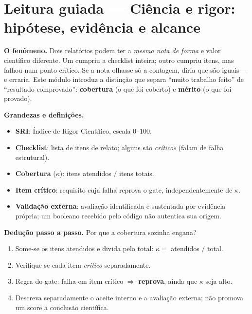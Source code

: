 

\section[Leitura guiada]{Leitura guiada — Ciência e rigor: hipótese, evidência e alcance}


\begin{descricao}
\textbf{O fenômeno.} Dois relatórios podem ter a \emph{mesma nota de forma} e valor
científico diferente. Um cumpriu a checklist inteira; outro cumpriu itens, mas falhou
num ponto crítico. Se a nota olhasse só a contagem, diria que são iguais --- e
erraria. Este módulo introduz a distinção que separa ``muito trabalho feito'' de
``resultado comprovado'': \textbf{cobertura} (o que foi coberto) e \textbf{mérito}
(o que foi provado).
\end{descricao}

\begin{definicao}
\textbf{Grandezas e definições.}
\begin{itemize}[leftmargin=1.3em,itemsep=1pt]
  \item \textbf{SRI}: Índice de Rigor Científico, escala $0$--$100$.
  \item \textbf{Checklist}: lista de itens de relato; alguns são \emph{críticos} (falam de falha estrutural).
  \item \textbf{Cobertura} ($\kappa$): itens atendidos $/$ itens totais.
  \item \textbf{Item crítico}: requisito cuja falha reprova o gate, independentemente de $\kappa$.
  \item \textbf{Validação externa}: avaliação identificada e sustentada por evidência própria; um booleano recebido pelo código não autentica sua origem.
\end{itemize}
\end{definicao}

\begin{metodo}
\textbf{Dedução passo a passo.} Por que a cobertura sozinha engana?
\begin{enumerate}[leftmargin=1.4em,itemsep=2pt]
  \item Some-se os itens atendidos e divida pelo total: $\kappa = $ atendidos $/$ total.
  \item Verifique-se cada item \emph{crítico} separadamente.
  \item Regra do gate: falha em item crítico $\Rightarrow$ \textbf{reprova}, ainda que $\kappa$ seja alto.
  \item Descreva separadamente o aceite interno e a avaliação externa; não promova um score a conclusão científica.
\end{enumerate}
\end{metodo}

